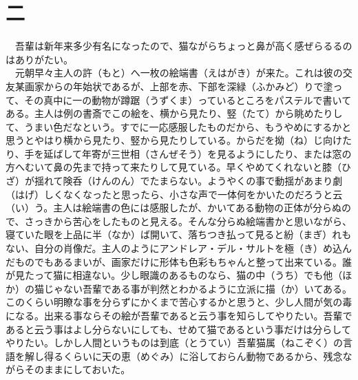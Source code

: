 \chapter*{二}
　吾輩は新年来多少有名になったので、猫ながらちょっと鼻が高く感ぜらるるのはありがたい。\\
　元朝早々主人の許（もと）へ一枚の絵端書（えはがき）が来た。これは彼の交友某画家からの年始状であるが、上部を赤、下部を深緑（ふかみど）りで塗って、その真中に一の動物が蹲踞（うずくま）っているところをパステルで書いてある。主人は例の書斎でこの絵を、横から見たり、竪（たて）から眺めたりして、うまい色だなという。すでに一応感服したものだから、もうやめにするかと思うとやはり横から見たり、竪から見たりしている。からだを拗（ね）じ向けたり、手を延ばして年寄が三世相（さんぜそう）を見るようにしたり、または窓の方へむいて鼻の先まで持って来たりして見ている。早くやめてくれないと膝（ひざ）が揺れて険呑（けんのん）でたまらない。ようやくの事で動揺があまり劇（はげ）しくなくなったと思ったら、小さな声で一体何をかいたのだろうと云（い）う。主人は絵端書の色には感服したが、かいてある動物の正体が分らぬので、さっきから苦心をしたものと見える。そんな分らぬ絵端書かと思いながら、寝ていた眼を上品に半（なか）ば開いて、落ちつき払って見ると紛（まぎ）れもない、自分の肖像だ。主人のようにアンドレア・デル・サルトを極（き）め込んだものでもあるまいが、画家だけに形体も色彩もちゃんと整って出来ている。誰が見たって猫に相違ない。少し眼識のあるものなら、猫の中（うち）でも他（ほか）の猫じゃない吾輩である事が判然とわかるように立派に描（か）いてある。このくらい明瞭な事を分らずにかくまで苦心するかと思うと、少し人間が気の毒になる。出来る事ならその絵が吾輩であると云う事を知らしてやりたい。吾輩であると云う事はよし分らないにしても、せめて猫であるという事だけは分らしてやりたい。しかし人間というものは到底（とうてい）吾輩猫属（ねこぞく）の言語を解し得るくらいに天の恵（めぐみ）に浴しておらん動物であるから、残念ながらそのままにしておいた。\\
